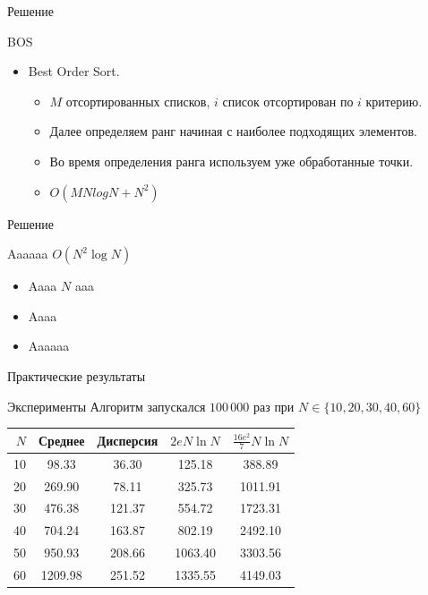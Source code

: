 \documentclass{beamer}
\begin{document}
\begin{frame}{Решение}
\begin{block}{BOS}
\begin{center}
\end{center}
\begin{itemize}
\item Best Order Sort.
\begin{itemize}
\item $M$ отсортированных списков, $i$ список отсортирован по $i$ критерию. 
\item Далее определяем ранг начиная с наиболее подходящих элементов. 
\item Во время определения ранга используем уже обработанные точки.
\item $O(MNlogN + N^2)$
\end{itemize}
\end{itemize}
\end{block}
\end{frame}


\begin{frame}{Решение}
\begin{block}{Aaaaaa $O(N^2 \log N)$}
\begin{itemize}
\item Aaaa $N$ aaa
\item Aaaa
\item Aaaaaa
\end{itemize}
\end{block}
\end{frame}

\begin{frame}{Практические результаты}
\begin{block}{Эксперименты}
Алгоритм запускался $100\,000$ раз при $N \in \{10, 20, 30, 40, 60\}$
\begin{table}[h]
\begin{center}
\begin{tabular}{r|c|c|c|c}
$N$ & Среднее & Дисперсия & $2eN \ln N$ & $\frac{16e^2}{7}N \ln N$ \\\hline
10 & 98.33 & 36.30 & 125.18 & 388.89 \\
20 & 269.90 & 78.11 & 325.73 & 1011.91 \\
30 & 476.38 & 121.37 & 554.72 & 1723.31 \\
40 & 704.24 & 163.87 & 802.19 & 2492.10 \\
50 & 950.93 & 208.66 & 1063.40 & 3303.56 \\
60 & 1209.98 & 251.52 & 1335.55 & 4149.03
\end{tabular}
\end{center}
\end{table}
\end{block}
\end{frame}
\end{document}
